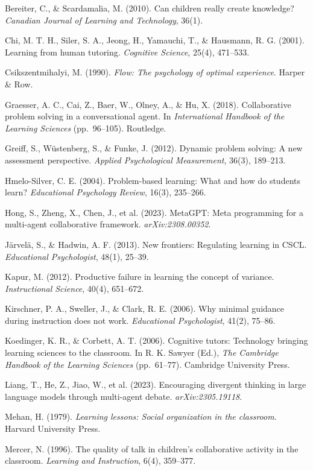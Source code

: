 \documentclass[
  11pt,
]{article}
\begin{document}
Bereiter, C., \& Scardamalia, M. (2010). Can children really create knowledge? \emph{Canadian Journal of Learning and Technology}, 36(1).

Chi, M. T. H., Siler, S. A., Jeong, H., Yamauchi, T., \& Hausmann, R. G. (2001). Learning from human tutoring. \emph{Cognitive Science}, 25(4), 471--533.

Csikszentmihalyi, M. (1990). \emph{Flow: The psychology of optimal experience}. Harper \& Row.

Graesser, A. C., Cai, Z., Baer, W., Olney, A., \& Hu, X. (2018). Collaborative problem solving in a conversational agent. In \emph{International Handbook of the Learning Sciences} (pp.\ 96--105). Routledge.

Greiff, S., Wüstenberg, S., \& Funke, J. (2012). Dynamic problem solving: A new assessment perspective. \emph{Applied Psychological Measurement}, 36(3), 189--213.

Hmelo-Silver, C. E. (2004). Problem-based learning: What and how do students learn? \emph{Educational Psychology Review}, 16(3), 235--266.

Hong, S., Zheng, X., Chen, J., et al. (2023). MetaGPT: Meta programming for a multi-agent collaborative framework. \emph{arXiv:2308.00352}.

Järvelä, S., \& Hadwin, A. F. (2013). New frontiers: Regulating learning in CSCL. \emph{Educational Psychologist}, 48(1), 25--39.

Kapur, M. (2012). Productive failure in learning the concept of variance. \emph{Instructional Science}, 40(4), 651--672.

Kirschner, P. A., Sweller, J., \& Clark, R. E. (2006). Why minimal guidance during instruction does not work. \emph{Educational Psychologist}, 41(2), 75--86.

Koedinger, K. R., \& Corbett, A. T. (2006). Cognitive tutors: Technology bringing learning sciences to the classroom. In R. K. Sawyer (Ed.), \emph{The Cambridge Handbook of the Learning Sciences} (pp.\ 61--77). Cambridge University Press.

Liang, T., He, Z., Jiao, W., et al. (2023). Encouraging divergent thinking in large language models through multi-agent debate. \emph{arXiv:2305.19118}.

Mehan, H. (1979). \emph{Learning lessons: Social organization in the classroom}. Harvard University Press.

Mercer, N. (1996). The quality of talk in children's collaborative activity in the classroom. \emph{Learning and Instruction}, 6(4), 359--377.
\end{document}
